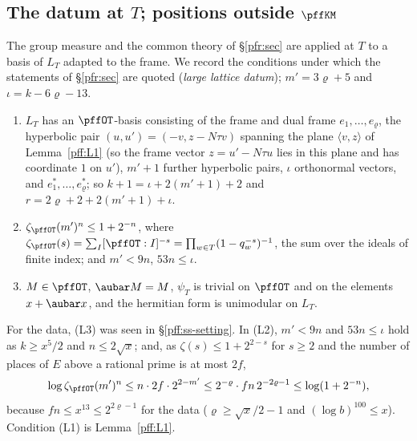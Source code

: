 \documentclass[10pt]{amsart}
\theoremstyle{definition}
\theoremstyle{remark}
\begin{document}
\subsection{The datum at $T$; positions outside $\pffKM$}\label{pff:ss-large}

The group measure and the common theory of \S\ref{pfr:sec} are applied at $T$ to a basis of $L_T$
adapted to the frame. We record the conditions under which the statements of \S\ref{pfr:sec} are
quoted (\emph{large lattice datum}); $m'=3\varrho+5$ and $\iota=k-6\varrho-13$.
\begin{enumerate}
\item[(L1)] $L_T$ has an $\pffOT$-basis consisting of the frame and dual frame
$e_1,\dots,e_\varrho$, the hyperbolic pair $(u,u')=(-v,z-N\tau v)$ spanning the plane $\langle v,z\rangle$
of Lemma~\ref{pff:L1} (so the frame vector $z=u'-N\tau u$ lies in this plane and has coordinate $1$ on $u'$),
$m'+1$ further hyperbolic pairs, $\iota$ orthonormal vectors, and $e_1^*,\dots,e^*_\varrho$; so
$k+1=\iota+2(m'+1)+2$ and $r=2\varrho+2+2(m'+1)+\iota$.
\item[(L2)] $\zeta_{\pffOT}(m')^n\le1+2^{-n}$, where $\zeta_{\pffOT}(s)=\sum_I[\pffOT:I]^{-s}=
\prod_{w\in T}(1-q_w^{-s})^{-1}$, the sum over the ideals of finite index; and $m'<9n$, $53n\le
\iota$.
\item[(L3)] $M\in\pffOT$, $\aubar M=M$, $\psi_T$ is trivial on $\pffOT$ and on the elements
$x+\aubar x$, and the hermitian form is unimodular on $L_T$.
\end{enumerate}
For the data, (L3) was seen in \S\ref{pff:ss-setting}. In (L2), $m'<9n$ and $53n\le\iota$ hold as
$k\ge x^5/2$ and $n\le2\sqrt x$; and, as $\zeta(s)\le1+2^{2-s}$ for $s\ge2$ and the number of places
of $E$ above a rational prime is at most $2f$,
\[
\log\zeta_{\pffOT}(m')^n\le n\cdot2f\cdot2^{2-m'}\le2^{-\varrho}\cdot fn\,2^{-2\varrho-1}\le
\log(1+2^{-n}),
\]
because $fn\le x^{13}\le2^{2\varrho-1}$ for the data ($\varrho\ge\sqrt x/2-1$ and $(\log b)^{100}\le
x$). Condition (L1) is Lemma~\ref{pff:L1}.
\end{document}
